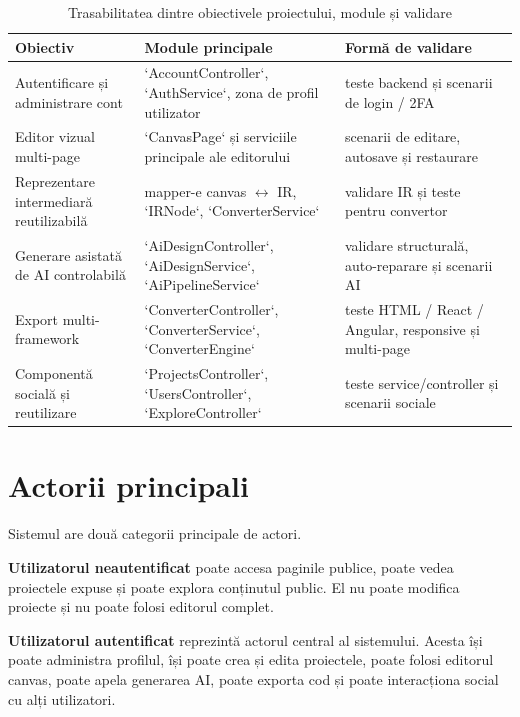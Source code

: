 \begin{table}[H]
  \centering
  \caption{Trasabilitatea dintre obiectivele proiectului, module și validare}
  \label{tab:trasabilitate-obiective}
  \renewcommand{\arraystretch}{1.15}
  \begin{tabularx}{\textwidth}{>{\RaggedRight\arraybackslash}p{4.2cm}YY}
    \toprule
    \textbf{Obiectiv} & \textbf{Module principale} & \textbf{Formă de validare} \\
    \midrule
    Autentificare și administrare cont & `AccountController`, `AuthService`, zona de profil utilizator & teste backend și scenarii de login / 2FA \\
    Editor vizual multi-page & `CanvasPage` și serviciile principale ale editorului & scenarii de editare, autosave și restaurare \\
    Reprezentare intermediară reutilizabilă & mapper-e canvas $\leftrightarrow$ IR, `IRNode`, `ConverterService` & validare IR și teste pentru convertor \\
    Generare asistată de AI controlabilă & `AiDesignController`, `AiDesignService`, `AiPipelineService` & validare structurală, auto-reparare și scenarii AI \\
    Export multi-framework & `ConverterController`, `ConverterService`, `ConverterEngine` & teste HTML / React / Angular, responsive și multi-page \\
    Componentă socială și reutilizare & `ProjectsController`, `UsersController`, `ExploreController` & teste service/controller și scenarii sociale \\
    \bottomrule
  \end{tabularx}
\end{table}

\section{Actorii principali}

Sistemul are două categorii principale de actori.

\textbf{Utilizatorul neautentificat} poate accesa paginile publice, poate vedea proiectele expuse și poate explora conținutul public. El nu poate modifica proiecte și nu poate folosi editorul complet.

\textbf{Utilizatorul autentificat} reprezintă actorul central al sistemului. Acesta își poate administra profilul, își poate crea și edita proiectele, poate folosi editorul canvas, poate apela generarea AI, poate exporta cod și poate interacționa social cu alți utilizatori.

